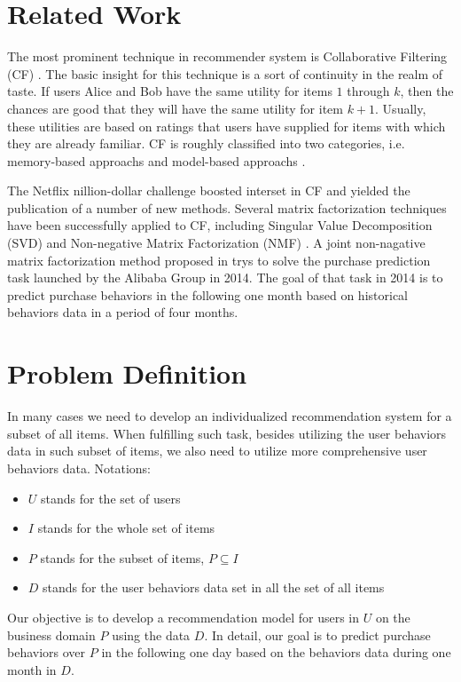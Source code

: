 \documentclass{llncs}
\begin{document}
\section{Related Work}
The most prominent technique in recommender system is
Collaborative Filtering (CF) \cite{su2009survey}.
The basic insight for this technique is a sort of continuity in the realm of taste.
If users Alice and Bob have the same utility for items $1$ through $k$,
then the chances are good that they will have the same utility for item $k + 1$.
Usually, these utilities are based on ratings that users have supplied for items
with which they are already familiar.
CF is roughly classified into two categories,
i.e. memory-based approachs \cite{linden2003amazon, wang2006unifying}
and model-based approachs \cite{adomavicius2005toward, koren2009matrix}.

The Netflix nillion-dollar challenge boosted interset in CF and yielded
the publication of a number of new methods.
Several matrix factorization techniques have been successfully applied to CF,
including Singular Value Decomposition (SVD) \cite{paterek2007improving}
and Non-negative Matrix Factorization (NMF) \cite{lee1999learning}.
A joint non-nagative matrix factorization method proposed in \cite{ju2014modeling} 
trys to solve the purchase prediction task launched by the Alibaba Group in 2014.
The goal of that task in 2014 is to predict purchase behaviors in the following one month
based on historical behaviors data in a period of four months.


\section{Problem Definition}
In many cases we need to develop an individualized recommendation system
for a subset of all items. When fulfilling such task,
besides utilizing the user behaviors data
in such subset of items, we also need to utilize
more comprehensive user behaviors data.
Notations:
\begin{itemize}
	\item $U$ stands for the set of users
	\item $I$ stands for the whole set of items
	\item $P$ stands for the subset of items, $P \subseteq I$
	\item $D$ stands for the user behaviors data set in all the set of all items
\end{itemize}

Our objective is to develop a recommendation model
for users in $U$ on the business domain $P$ using the data $D$.
In detail, our goal is to predict purchase behaviors over $P$
in the following one day based on the behaviors data during one month in $D$.
\end{document}

